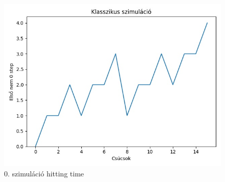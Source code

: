 \documentclass[14pt,a4paper]{article}
\begin{document}
\begin{figure}[H]
\centering
\includegraphics[width = 0.7\columnwidth]{sim_00/hitting_time.jpg}
\caption{0. szimuláció hitting time}
\end{figure}
\end{document}
